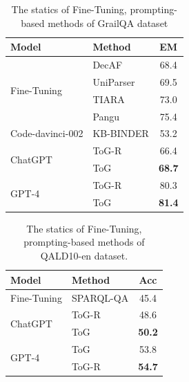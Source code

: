\documentclass{article} %
\begin{document}
\begin{table}[]
\centering
\begin{tabular}{llc}
\hline
       \textbf{Model}    & \textbf{Method} &  \textbf{EM} \\ \hline
\multirow{4}{*}{Fine-Tuning} 

&  	DecAF 
 \citep{webqsp1}                    & 68.4		 \\
 &  UniParser 
 \citep{liu2022uni}                    &  69.5	   \\
 &  TIARA \citep{grailqa1}                    & 73.0 \\

                                 &  Pangu   \citep{gu2023dont}                       & 75.4	 \\
                                 
                                 
                                  \hline
Code-davinci-002                 &  KB-BINDER \citep{DB-BLINDER}            &  53.2  \\ \hline
\multirow{2}{*}{ChatGPT}          
                                 &  ToG-R                     &  66.4  \\
                                 &  ToG                 & \textbf{68.7}   \\ \hline
\multirow{2}{*}{GPT-4}          
                                 &  ToG-R                     &  80.3  \\
                                 &  ToG                 & \textbf{81.4}   \\ \hline
\end{tabular}

\caption{The statics of Fine-Tuning, prompting-based methods of GrailQA dataset}
\label{tab: grailqa}
\end{table}



\begin{table}[]
\centering
\begin{tabular}{llc}
\hline
       \textbf{Model}    & \textbf{Method} &  \textbf{Acc} \\ \hline
\multirow{1}{*}{Fine-Tuning}     &  SPARQL-QA\citep{qald10-en1} 	& 45.4 	\\ \hline
\multirow{2}{*}{ChatGPT}          &  ToG-R                     &  48.6  \\
                                 &  ToG                 & \textbf{50.2}   \\ \hline
\multirow{2}{*}{GPT-4}          &  ToG                     &   53.8\\
                                 &  ToG-R               & \textbf{54.7}   \\ \hline
\end{tabular}

\caption{The statics of Fine-Tuning, prompting-based methods of QALD10-en dataset.}
\label{tab: qald}
\end{table}
\end{document}
